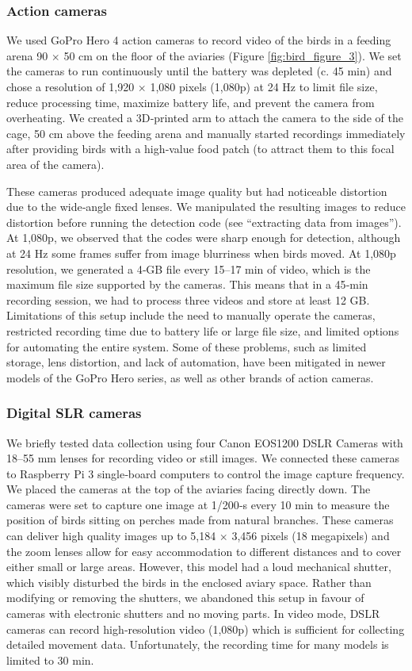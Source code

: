 \documentclass[11pt,a4paper,oneside]{book}
\begin{document}
\begin{doublespace}
\subsubsection{Action cameras}
We used GoPro Hero 4 action cameras to record video of the birds in a feeding arena 90 $\times$ 50 cm on the floor of the aviaries (Figure \ref{fig:bird_figure_3}). We set the cameras to run continuously until the battery was depleted (c. 45 min) and chose a resolution of 1,920 $\times$ 1,080 pixels (1,080p) at 24 Hz to limit file size, reduce processing time, maximize battery life, and prevent the camera from overheating. We created a 3D‐printed arm to attach the camera to the side of the cage, 50 cm above the feeding arena and manually started recordings immediately after providing birds with a high‐value food patch (to attract them to this focal area of the camera).

These cameras produced adequate image quality but had noticeable distortion due to the wide‐angle fixed lenses. We manipulated the resulting images to reduce distortion before running the detection code (see “extracting data from images”). At 1,080p, we observed that the codes were sharp enough for detection, although at 24 Hz some frames suffer from image blurriness when birds moved. At 1,080p resolution, we generated a 4‐GB file every 15–17 min of video, which is the maximum file size supported by the cameras. This means that in a 45‐min recording session, we had to process three videos and store at least 12 GB. Limitations of this setup include the need to manually operate the cameras, restricted recording time due to battery life or large file size, and limited options for automating the entire system. Some of these problems, such as limited storage, lens distortion, and lack of automation, have been mitigated in newer models of the GoPro Hero series, as well as other brands of action cameras.

\subsubsection{Digital SLR cameras}
We briefly tested data collection using four Canon EOS1200 DSLR Cameras with 18–55 mm lenses for recording video or still images. We connected these cameras to Raspberry Pi 3 single‐board computers to control the image capture frequency. We placed the cameras at the top of the aviaries facing directly down. The cameras were set to capture one image at 1/200‐s every 10 min to measure the position of birds sitting on perches made from natural branches. These cameras can deliver high quality images up to 5,184 $\times$ 3,456 pixels (18 megapixels) and the zoom lenses allow for easy accommodation to different distances and to cover either small or large areas. However, this model had a loud mechanical shutter, which visibly disturbed the birds in the enclosed aviary space. Rather than modifying or removing the shutters, we abandoned this setup in favour of cameras with electronic shutters and no moving parts. In video mode, DSLR cameras can record high‐resolution video (1,080p) which is sufficient for collecting detailed movement data. Unfortunately, the recording time for many models is limited to 30 min.


\end{doublespace}
\end{document}
